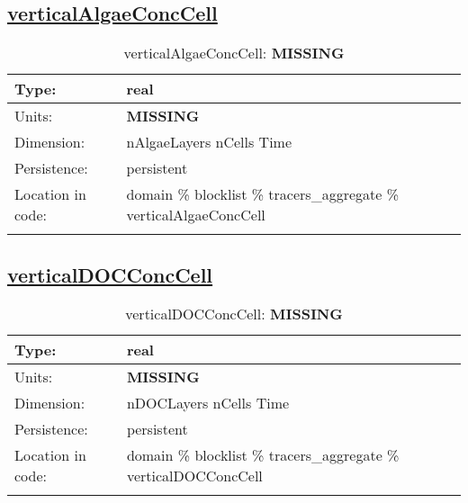 \subsection[verticalAlgaeConcCell]{\hyperref[sec:var_tab_tracers_aggregate]{verticalAlgaeConcCell}}
\label{subsec:var_sec_tracers_aggregate_verticalAlgaeConcCell}
\begin{center}
\begin{longtable}{| p{2.0in} | p{4.0in} |}
        \hline 
        Type: & real \\
        \hline 
        Units: & {\bf \color{red} MISSING} \\
        \hline 
        Dimension: & nAlgaeLayers nCells Time \\
        \hline 
        Persistence: & persistent \\
        \hline 
         Location in code: & domain \% blocklist \% tracers\_aggregate \% verticalAlgaeConcCell \\
         \hline 
    \caption{verticalAlgaeConcCell: {\bf \color{red} MISSING}}
\end{longtable}
\end{center}
\subsection[verticalDOCConcCell]{\hyperref[sec:var_tab_tracers_aggregate]{verticalDOCConcCell}}
\label{subsec:var_sec_tracers_aggregate_verticalDOCConcCell}
\begin{center}
\begin{longtable}{| p{2.0in} | p{4.0in} |}
        \hline 
        Type: & real \\
        \hline 
        Units: & {\bf \color{red} MISSING} \\
        \hline 
        Dimension: & nDOCLayers nCells Time \\
        \hline 
        Persistence: & persistent \\
        \hline 
         Location in code: & domain \% blocklist \% tracers\_aggregate \% verticalDOCConcCell \\
         \hline 
    \caption{verticalDOCConcCell: {\bf \color{red} MISSING}}
\end{longtable}
\end{center}
